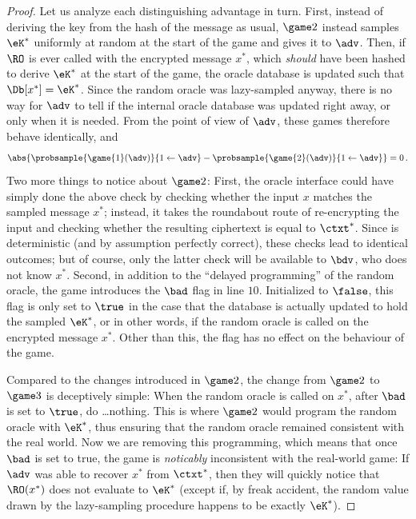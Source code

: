 \begin{proof}
      Let us analyze each distinguishing advantage in turn.
        First, instead of deriving the key from the hash of the message as
        usual, $\game 2$ instead samples $\eK^*$ uniformly at random at the start
        of the game and gives it to $\adv$. Then, if $\RO$ is ever called with
        the encrypted message $x^*$, which \emph{should} have been hashed to
        derive $\eK^*$ at the start of the game, the oracle database is updated such that
        $\Db[x^*] = \eK^*$. Since the random oracle was lazy-sampled anyway,
        there is no way for $\adv$ to tell if the internal oracle database was
        updated right away, or only when it is needed. From the point of view
        of $\adv$, these games therefore behave identically, and
      \begin{align*}
        \abs{\probsample{ \game{1}(\adv) }{1 \gets \adv} 
          - \probsample{ \game{2}(\adv) }{1 \gets \adv}} = 0\, . 
      \end{align*}
      Two more things to notice about $\game 2$: First, the oracle interface
        could have simply done the above check by checking whether the input $x$
        matches the sampled message $x^*$; instead, it takes the roundabout
        route of re-encrypting the input and checking whether the resulting
        ciphertext is equal to $\ctxt^*$. Since \dPKE is deterministic
        (and by assumption perfectly correct), these checks lead to identical
        outcomes; but of course, only the latter check will be available to $\bdv$,
        who does not know $x^*$. Second, in addition to the ``delayed
        programming'' of the random oracle, the game introduces the $\bad$
        flag in line $10$. Initialized to $\false$, this flag is only set to
        $\true$ in the case that the database is actually updated to hold the
        sampled $\eK^*$, or in other words, if the random oracle is called on
        the encrypted message $x^*$. Other than this, the flag has no effect on the
        behaviour of the game.

      Compared to the changes introduced in $\game 2$, the change from 
        $\game 2$ to $\game 3$ is deceptively simple: When the random oracle is
        called on $x^*$, after $\bad$ is set to $\true$, do \ldots nothing.
        This is where $\game 2$ would program the random oracle with $\eK^*$,
        thus ensuring that the random oracle remained consistent with the
        real world. Now we are removing this programming, which means that
        once $\bad$ is set to true,
        the game is \emph{noticably} inconsistent with the real-world game:
        If $\adv$ was able to recover $x^*$ from $\ctxt^*$, then they will
        quickly notice that $\RO(x^*)$ does not evaluate to $\eK^*$ (except
        if, by freak accident, the random value drawn by the lazy-sampling
        procedure happens to be exactly $\eK^*$).


\end{proof}

